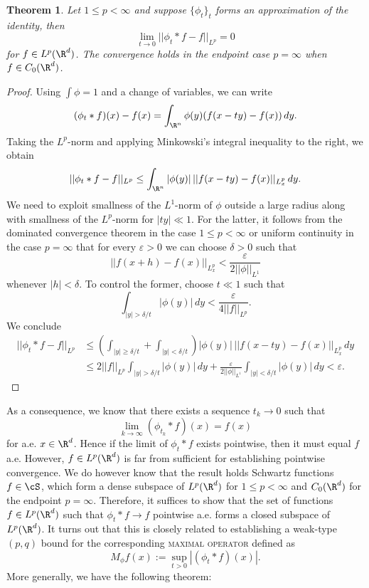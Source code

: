 \documentclass[reqno]{amsart}
\newtheorem{theorem}{Theorem}
\theoremstyle{definition}
\theoremstyle{remark}
\renewcommand{\epsilon}{\varepsilon}
\renewcommand{\emph}{\textsc}
\begin{document}
\begin{theorem}
	Let $1 \leq p < \infty$ and suppose $\{ \phi_t\}_t$ forms an approximation of the identity, then 
		\[ \lim_{t \to 0} ||\phi_t * f - f||_{L^p} = 0 \]
	for $f \in L^p (\R^d)$. The convergence holds in the endpoint case $p = \infty$ when $f \in C_0 (\R^d)$.
\end{theorem}

\begin{proof}
	Using $\int \phi = 1$ and a change of variables, we can write
		\[ (\phi_t * f)(x) - f(x) = \int_{\R^n} \phi(y) (f(x - ty) - f(x)) \, dy. \]
	Taking the $L^p$-norm and applying Minkowski's integral inequality to the right, we obtain	
		\[ ||\phi_t * f - f||_{L^p} \leq \int_{\R^n} |\phi(y)| \, ||f (x - ty) - f(x)||_{L^p_x} \, dy. \]
	We need to exploit smallness of the $L^1$-norm of $\phi$ outside a large radius along with smallness of the $L^p$-norm for $|ty| \ll 1$. For the latter, it follows from the dominated convergence theorem in the case $1 \leq p < \infty$ or uniform continuity in the case $p = \infty$ that for every $\epsilon > 0$ we can choose $\delta > 0$ such that 
		\[ || f (x + h) - f(x)||_{L^p_x} < \frac{\epsilon}{2 ||\phi||_{L^1}} \]
	whenever $|h| < \delta$. To control the former, choose $t \ll 1$ such that
		\[ \int_{|y| > \delta/t} |\phi(y)| \, dy < \frac{\epsilon}{4 ||f||_{L^p}}. \]
	We conclude
		\begin{align*}
			 ||\phi_t * f - f||_{L^p}
			 	&\leq
			 	\left( \int_{|y| \geq \delta/t} + \int_{|y| < \delta/t}\right) |\phi(y)| \, ||f (x - ty) - f(x)||_{L^p_x} \, dy\\
			 &	\leq 2|| f||_{L^p} \int_{|y| > \delta/t} |\phi(y)| \, dy + \frac{\epsilon}{2 ||\phi||_{L^1}} \int_{|y| < \delta/t} |\phi(y)| \, dy < \epsilon.
		\end{align*}
\end{proof}

As a consequence, we know that there exists a sequence $t_k \to 0$ such that 
		\[ \lim_{k \to \infty} (\phi_{t_k} * f)(x) = f(x) \]
	for a.e. $x \in \R^d$. Hence if the limit of $\phi_t * f$ exists pointwise, then it must equal $f$ a.e. However, $f \in L^p (\R^d)$ is far from sufficient for establishing pointwise convergence. We do however know that the result holds Schwartz functions $f \in \cS$, which form a dense subspace of $L^p (\R^d)$ for $1 \leq p < \infty$ and $C_0 (\R^d)$ for the endpoint $p = \infty$. Therefore, it suffices to show that the set of functions $f \in L^p (\R^d)$ such that $\phi_t * f \to f$ pointwise a.e. forms a closed subspace of $L^p (\R^d)$. It turns out that this is closely related to establishing a weak-type $(p, q)$ bound for the corresponding \emph{maximal operator} defined as	
	\[ M_\phi f (x) := \sup_{t > 0} |(\phi_t * f) (x)|. \]
More generally, we have the following theorem:
\end{document}
